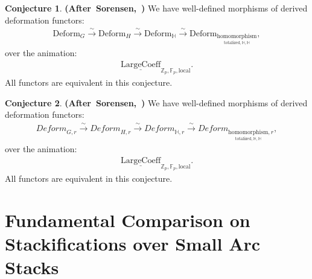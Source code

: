 \documentclass[12pt]{article}
\theoremstyle{definition}
\newtheorem{conjecture}{Conjecture}
\begin{document}
\begin{conjecture}\mbox{\textbf{(After Sorensen, \cite[Theorem 1.1]{So1})}}
We have well-defined morphisms of derived deformation functors:
\begin{align}
\mathrm{Deform}_{G}\overset{\sim}{\rightarrow}\mathrm{Deform}_H\overset{\sim}{\rightarrow} \mathrm{Deform}_\mathbb{H}\overset{\sim}{\rightarrow} \mathrm{Deform}_{\underset{{\mathrm{totalized},\mathbb{H},\mathbb{H}}}{\mathrm{homomorphism}}},
\end{align}
over the animation:
\begin{align}
\underline{\mathrm{LargeCoeff}}_{\mathbb{Z}_p,\mathbb{F}_p,\mathrm{local}}.
\end{align}
All functors are equivalent in this conjecture.
\end{conjecture}

\begin{conjecture}\mbox{\textbf{(After Sorensen, \cite[Theorem 1.1]{So1})}}
We have well-defined morphisms of derived deformation functors:
\begin{align}
\textit{Deform}_{G,r}\overset{\sim}{\rightarrow} \textit{Deform}_{H,r}\overset{\sim}{\rightarrow} \textit{Deform}_{\mathbb{H},r}\overset{\sim}{\rightarrow} \textit{Deform}_{\underset{{\mathrm{totalized},\mathbb{H},\mathbb{H}}}{\mathrm{homomorphism}},r},
\end{align}
over the animation:
\begin{align}
\underline{\mathrm{LargeCoeff}}_{\mathbb{Z}_p,\mathbb{F}_p,\mathrm{local}}.
\end{align}
All functors are equivalent in this conjecture.
\end{conjecture}

\newpage
\section{Fundamental Comparison on Stackifications over Small Arc Stacks}\label{section5}
\end{document}
